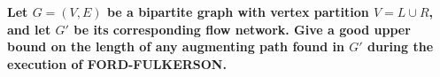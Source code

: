 \textbf{Let $G = (V, E)$ be a bipartite graph with vertex partition $V = L \cup R$, and let $G'$ be its corresponding flow network. Give a good upper bound on the length of any augmenting path found in $G'$ during the execution of FORD-FULKERSON.}\vspace{.2cm}

\textcolor{bibi}{}
\begin{quote}
\end{quote}